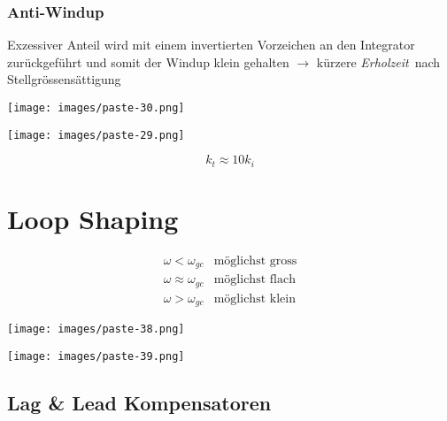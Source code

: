 \documentclass[
  10pt,
  a4paper,
  twocolumn]{article}
\numberwithin{equation}{section}
\begin{document}
\subsubsection{Anti-Windup}\label{anti-windup}

Exzessiver Anteil wird mit einem invertierten Vorzeichen an den
Integrator zurückgeführt und somit der Windup klein gehalten
\(\rightarrow\) kürzere \emph{Erholzeit}~nach Stellgrössensättigung

\begin{center}
\texttt{[image: images/paste-30.png]}
\end{center}

\begin{center}
\texttt{[image: images/paste-29.png]}
\end{center}

\[
k_t \approx 10 k_i
\]

\section{Loop Shaping}\label{loop-shaping}

\begin{tcolorbox}[enhanced jigsaw, coltitle=black, colback=white, breakable, colframe=quarto-callout-important-color-frame, rightrule=.15mm, left=2mm, opacityback=0, leftrule=.75mm, toptitle=1mm, colbacktitle=quarto-callout-important-color!10!white, bottomtitle=1mm, arc=.35mm, bottomrule=.15mm, title=\textcolor{quarto-callout-important-color}{\faExclamation}\hspace{0.5em}{Verlauf von \(\lvert L\rvert\)}, titlerule=0mm, toprule=.15mm, opacitybacktitle=0.6]

\[
\begin{array}{ll}
\omega < \omega_{gc} & \text{möglichst gross} \\
\omega \approx \omega_{gc} & \text{möglichst flach} \\
\omega > \omega_{gc} & \text{möglichst klein}
\end{array}
\]

\end{tcolorbox}

\texttt{[image: images/paste-38.png]}

\texttt{[image: images/paste-39.png]}

\subsection{Lag \& Lead Kompensatoren}\label{lag-lead-kompensatoren}
\end{document}
